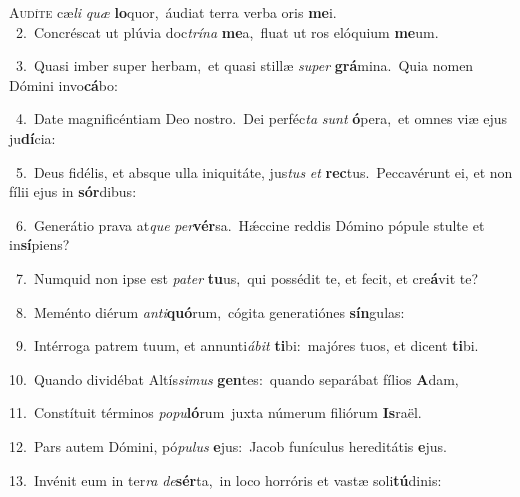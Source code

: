 \lettrine{\initial\textcolor{\initialcolor}{A}}{udíte} cæ\textit{li} \textit{quæ} \textbf{lo}\-quor,~\star áudiat terra verba oris \textbf{me}\-i.\\
{\numbfont\textcolor{\numbcolor}{~2.}}~Concréscat ut plúvia doc\-\textit{trí}\-\textit{na} \textbf{me}\-a,~\star fluat ut ros elóquium \textbf{me}\-um.\par
{\numbfont\textcolor{\numbcolor}{~3.}}~Quasi imber super herbam,~\dagger et quasi stillæ \textit{su}\-\textit{per} \textbf{grá}\-mina.~\star Quia nomen Dómini invo\-\textbf{cá}\-bo:\par
{\numbfont\textcolor{\numbcolor}{~4.}}~Date magnificéntiam Deo nostro.~\dagger Dei perféc\textit{ta} \textit{sunt} \textbf{ó}\-pera,~\star et omnes viæ ejus ju\-\textbf{dí}\-cia:\par
{\numbfont\textcolor{\numbcolor}{~5.}}~Deus fidélis, et absque ulla iniquitáte, jus\textit{tus} \textit{et} \textbf{rec}\-tus.~\star Peccavérunt ei, et non fílii ejus in \textbf{sór}\-dibus:\par
{\numbfont\textcolor{\numbcolor}{~6.}}~Generátio prava at\textit{que} \textit{per}\-\textbf{vér}sa.~\star Hǽccine reddis Dómino pópule stulte et in\-\textbf{sí}\-piens?\par
{\numbfont\textcolor{\numbcolor}{~7.}}~Numquid non ipse est \textit{pa}\-\textit{ter} \textbf{tu}\-us,~\star qui possédit te, et fecit, et cre\-\textbf{á}\-vit te?\par
{\numbfont\textcolor{\numbcolor}{~8.}}~Meménto diérum \textit{an}\-\textit{ti}\textbf{quó}rum,~\star cógita generatiónes \textbf{sín}\-gulas:\par
{\numbfont\textcolor{\numbcolor}{~9.}}~Intérroga patrem tuum, et annunti\-\textit{á}\-\textit{bit} \textbf{ti}\-bi:~\star majóres tuos, et dicent \textbf{ti}\-bi.\par
{\numbfont\textcolor{\numbcolor}{10.}}~Quando dividébat Altís\-\textit{si}\-\textit{mus} \textbf{gen}\-tes:~\star quando separábat fílios \textbf{A}\-dam,\par
{\numbfont\textcolor{\numbcolor}{11.}}~Constítuit términos \textit{po}\-\textit{pu}\textbf{ló}rum~\star juxta númerum filiórum \textbf{Is}\-raël.\par
{\numbfont\textcolor{\numbcolor}{12.}}~Pars autem Dómini, pó\-\textit{pu}\-\textit{lus} \textbf{e}\-jus:~\star Jacob funículus hereditátis \textbf{e}\-jus.\par
{\numbfont\textcolor{\numbcolor}{13.}}~Invénit eum in ter\textit{ra} \textit{de}\-\textbf{sér}ta,~\star in loco horróris et vastæ soli\-\textbf{tú}\-dinis:\par
